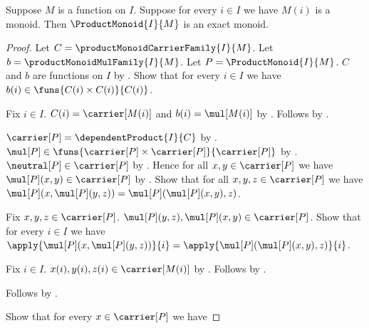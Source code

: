 \begin{theorem}\label{product_monoid_is_exact}
    Suppose $M$ is a function on $I$.
    Suppose for every $i\in I$ we have $M(i)$ is a monoid.
    Then $\ProductMonoid{I}{M}$ is an exact monoid.
\end{theorem}
\begin{proof}
    Let $C=\productMonoidCarrierFamily{I}{M}$.
    Let $b=\productMonoidMulFamily{I}{M}$.
    Let $P=\ProductMonoid{I}{M}$.
    $C$ and $b$ are functions on $I$ by
        .
    Show that for every $i\in I$ we have
        $b(i)\in\funs{C(i)\times C(i)}{C(i)}$.
    \begin{subproof}
        Fix $i\in I$.
        $C(i)=\carrier[M(i)]$ and $b(i)=\mul[M(i)]$ by
            .
        Follows by .
    \end{subproof}
    $\carrier[P]=\dependentProduct{I}{C}$ by
        .
    $\mul[P]\in\funs{\carrier[P]\times\carrier[P]}{
        \carrier[P]}$ by
        .
    $\neutral[P]\in\carrier[P]$ by
        .
    Hence for all $x,y\in\carrier[P]$ we have
        $\mul[P](x,y)\in\carrier[P]$ by
        .
    Show that for all $x,y,z\in\carrier[P]$ we have
        $\mul[P](x,\mul[P](y,z))=\mul[P](\mul[P](x,y),z)$.
    \begin{subproof}
        Fix $x,y,z\in\carrier[P]$.
        $\mul[P](y,z),\mul[P](x,y)\in\carrier[P]$.
        Show that for every $i\in I$ we have
            $\apply{\mul[P](x,\mul[P](y,z))}{i}
                =\apply{\mul[P](\mul[P](x,y),z)}{i}$.
        \begin{subproof}
            Fix $i\in I$.
            $x(i),y(i),z(i)\in\carrier[M(i)]$ by
                .
            Follows by
                .
        \end{subproof}
        Follows by
            .
    \end{subproof}
    Show that for every $x\in\carrier[P]$ we have

\end{proof}
